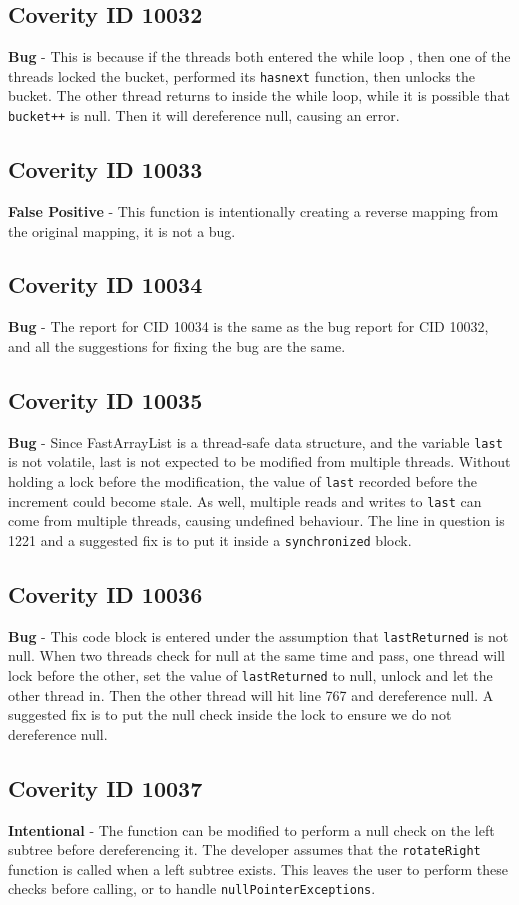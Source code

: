 \documentclass[12pt]{article}
\begin{document}
\subsection{Coverity ID 10032}
\textbf{Bug} - This is because if the threads both entered the while loop , then one of the threads locked the bucket, performed its \texttt{hasnext} function, then unlocks the bucket. The other thread returns to inside the while loop, while it is possible that \texttt{bucket++} is null. Then it will dereference null, causing an error.
\subsection{Coverity ID 10033}
\textbf{False Positive} - This function is intentionally creating a reverse mapping from the original mapping, it is not a bug.
\subsection{Coverity ID 10034}
\textbf{Bug} - The report for CID 10034 is the same as the bug report for CID 10032, and all the suggestions for fixing the bug are the same.
\subsection{Coverity ID 10035}
\textbf{Bug} - Since FastArrayList is a thread-safe data structure, and the variable \texttt{last} is not volatile, last is not expected to be modified from multiple threads. Without holding a lock before the modification, the value of \texttt{last} recorded before the increment could become stale. As well, multiple reads and writes to \texttt{last} can come from multiple threads, causing undefined behaviour. The line in question is 1221 and a suggested fix is to put it inside a \texttt{synchronized} block.
\subsection{Coverity ID 10036}
\textbf{Bug} - This code block is entered under the assumption that \texttt{lastReturned} is not null. When two threads check for null at the same time and pass, one thread will lock before the other, set the value of \texttt{lastReturned} to null, unlock and let the other thread in. Then the other thread will hit line 767 and dereference null. A suggested fix is to put the null check inside the lock to ensure we do not dereference null.
\subsection{Coverity ID 10037}
\textbf{Intentional} - The function can be modified to perform a null check on the left subtree before dereferencing it. The developer assumes that the \texttt{rotateRight} function is called when a left subtree exists. This leaves the user to perform these checks before calling, or to handle \texttt{nullPointerExceptions}.
\end{document}
